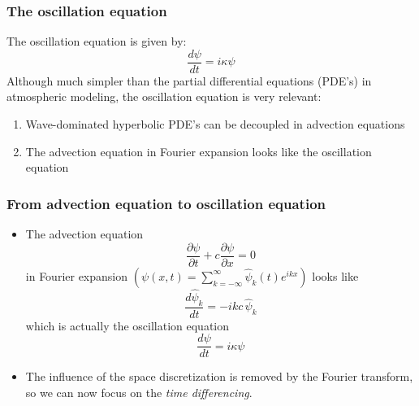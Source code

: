 \documentclass[aspectratio=149,9pt]{beamer}
\begin{document}
%
%
\begin{frame}
	\frametitle{The oscillation equation}
	The oscillation equation is given by:
	\begin{equation*}
		\frac{d \psi}{d t} = i \kappa \psi
	\end{equation*}
	Although much simpler than the partial differential equations (PDE's) in atmospheric modeling, the oscillation equation is very relevant:\vspace*{2ex}
	\begin{enumerate}
		\item Wave-dominated hyperbolic PDE's can be decoupled in advection equations\vspace*{2ex}
		\item The advection equation in Fourier expansion looks like the oscillation equation
	\end{enumerate}
\end{frame}
%
%
%
\begin{frame}
	\frametitle{From advection equation to oscillation equation}
	\begin{itemize}
		\item The advection equation
			\begin{equation*}
				\frac{\partial \psi}{\partial t} + c \frac{\partial \psi}{\partial x} = 0
			\end{equation*}
			in Fourier expansion $\left(\psi(x,t)=\sum_{k=-\infty}^{\infty} \hat\psi_k(t)e^{ikx}\right)$ looks like
			\begin{equation*}
				\frac{d \hat\psi_k}{d t} = - i k c \, \hat\psi_k
			\end{equation*}
			which is actually the oscillation equation
			\begin{equation*}
				\frac{d \psi}{d t} = i \kappa \psi
			\end{equation*}
		\item The influence of the space discretization is removed by the Fourier transform, so we can now focus on the \emph{time differencing}.
	\end{itemize}
%
\end{frame}
%
%
%
\end{document}
